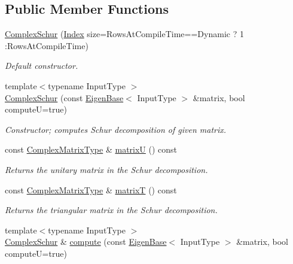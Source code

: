 \subsection*{Public Member Functions}
\begin{DoxyCompactItemize}
\item 
\mbox{\hyperlink{class_eigen_1_1_complex_schur_ad707d9978dc36b3b15e460c2a83f4093}{Complex\+Schur}} (\mbox{\hyperlink{class_eigen_1_1_complex_schur_a652104d13723a5b1db2937866a034557}{Index}} size=Rows\+At\+Compile\+Time==Dynamic ? 1 \+:Rows\+At\+Compile\+Time)
\begin{DoxyCompactList}\small\item\em Default constructor. \end{DoxyCompactList}\item 
{\footnotesize template$<$typename Input\+Type $>$ }\\\mbox{\hyperlink{class_eigen_1_1_complex_schur_a9c92c6e4c33890d2d063c5c8dd22777d}{Complex\+Schur}} (const \mbox{\hyperlink{struct_eigen_1_1_eigen_base}{Eigen\+Base}}$<$ Input\+Type $>$ \&matrix, bool computeU=true)
\begin{DoxyCompactList}\small\item\em Constructor; computes Schur decomposition of given matrix. \end{DoxyCompactList}\item 
const \mbox{\hyperlink{class_eigen_1_1_complex_schur_af61fe57877d51cfb50178f78534042f0}{Complex\+Matrix\+Type}} \& \mbox{\hyperlink{class_eigen_1_1_complex_schur_afed8177cf9836f032d42bdb6c6bc6e01}{matrixU}} () const
\begin{DoxyCompactList}\small\item\em Returns the unitary matrix in the Schur decomposition. \end{DoxyCompactList}\item 
const \mbox{\hyperlink{class_eigen_1_1_complex_schur_af61fe57877d51cfb50178f78534042f0}{Complex\+Matrix\+Type}} \& \mbox{\hyperlink{class_eigen_1_1_complex_schur_add3ab5ed83f7f2f06b79fa910a2d5684}{matrixT}} () const
\begin{DoxyCompactList}\small\item\em Returns the triangular matrix in the Schur decomposition. \end{DoxyCompactList}\item 
{\footnotesize template$<$typename Input\+Type $>$ }\\\mbox{\hyperlink{class_eigen_1_1_complex_schur}{Complex\+Schur}} \& \mbox{\hyperlink{class_eigen_1_1_complex_schur_a3543d2c286563108cd9ace672bbb1c09}{compute}} (const \mbox{\hyperlink{struct_eigen_1_1_eigen_base}{Eigen\+Base}}$<$ Input\+Type $>$ \&matrix, bool computeU=true)

\end{DoxyCompactItemize}
